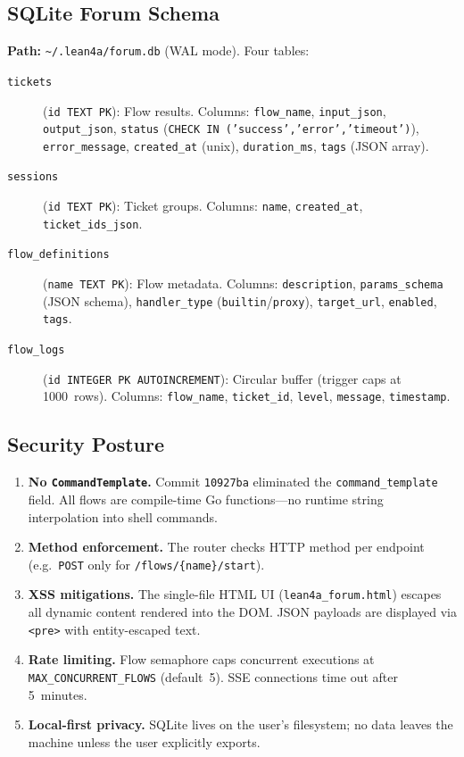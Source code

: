 \subsection{SQLite Forum Schema}

\textbf{Path:} \texttt{\textasciitilde/.lean4a/forum.db} (WAL mode).
Four tables:

\begin{description}
  \item[\texttt{tickets}] (\texttt{id TEXT PK}):
    Flow results.  Columns: \texttt{flow\_name}, \texttt{input\_json},
    \texttt{output\_json}, \texttt{status}
    (\texttt{CHECK IN ('success','error','timeout')}),
    \texttt{error\_message}, \texttt{created\_at} (unix), \texttt{duration\_ms},
    \texttt{tags} (JSON array).
  \item[\texttt{sessions}] (\texttt{id TEXT PK}):
    Ticket groups.  Columns: \texttt{name}, \texttt{created\_at},
    \texttt{ticket\_ids\_json}.
  \item[\texttt{flow\_definitions}] (\texttt{name TEXT PK}):
    Flow metadata.  Columns: \texttt{description}, \texttt{params\_schema}
    (JSON schema), \texttt{handler\_type} (\texttt{builtin}/\texttt{proxy}),
    \texttt{target\_url}, \texttt{enabled}, \texttt{tags}.
  \item[\texttt{flow\_logs}] (\texttt{id INTEGER PK AUTOINCREMENT}):
    Circular buffer (trigger caps at 1000~rows).  Columns: \texttt{flow\_name},
    \texttt{ticket\_id}, \texttt{level}, \texttt{message}, \texttt{timestamp}.
\end{description}

\subsection{Security Posture}

\begin{enumerate}
  \item \textbf{No \texttt{CommandTemplate}.}  Commit \texttt{10927ba}
        eliminated the \texttt{command\_template} field.  All flows are
        compile-time Go functions---no runtime string interpolation into
        shell commands.
  \item \textbf{Method enforcement.}  The router checks HTTP method per
        endpoint (e.g.\ \texttt{POST} only for \texttt{/flows/\{name\}/start}).
  \item \textbf{XSS mitigations.}  The single-file HTML UI
        (\texttt{lean4a\_forum.html}) escapes all dynamic content rendered into
        the DOM.  JSON payloads are displayed via \texttt{<pre>} with
        entity-escaped text.
  \item \textbf{Rate limiting.}  Flow semaphore caps concurrent executions at
        \texttt{MAX\_CONCURRENT\_FLOWS} (default~5).  SSE connections time out
        after 5~minutes.
  \item \textbf{Local-first privacy.}  SQLite lives on the user's filesystem;
        no data leaves the machine unless the user explicitly exports.
\end{enumerate}
